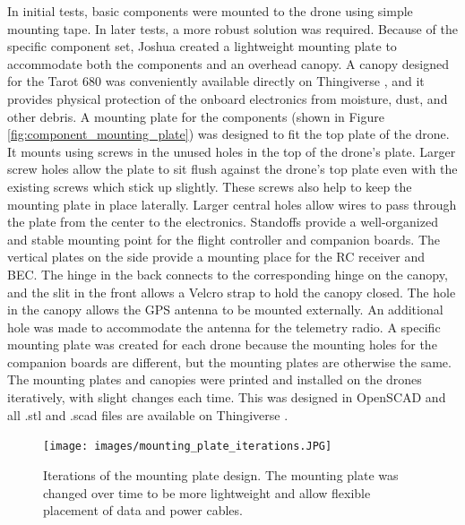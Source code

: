 In initial tests, basic components were mounted to the drone using simple mounting tape. In later tests, a more robust solution was required. Because of the specific component set, Joshua created a lightweight mounting plate to accommodate both the components and an overhead canopy. A canopy designed for the Tarot 680 was conveniently available directly on Thingiverse \cite{canopy_thingiverse}, and it provides physical protection of the onboard electronics from moisture, dust, and other debris. A mounting plate for the components (shown in Figure \ref{fig:component_mounting_plate}) was designed to fit the top plate of the drone. It mounts using screws in the unused holes in the top of the drone's plate. Larger screw holes allow the plate to sit flush against the drone's top plate even with the existing screws which stick up slightly. These screws also help to keep the mounting plate in place laterally. Larger central holes allow wires to pass through the plate from the center to the electronics. Standoffs provide a well-organized and stable mounting point for the flight controller and companion boards. The vertical plates on the side provide a mounting place for the RC receiver and BEC. The hinge in the back connects to the corresponding hinge on the canopy, and the slit in the front allows a Velcro strap to hold the canopy closed. The hole in the canopy allows the GPS antenna to be mounted externally. An additional hole was made to accommodate the antenna for the telemetry radio. A specific mounting plate was created for each drone because the mounting holes for the companion boards are different, but the mounting plates are otherwise the same. The mounting plates and canopies were printed and installed on the drones iteratively, with slight changes each time. This was designed in OpenSCAD and all .stl and .scad files are available on Thingiverse \cite{mounting_plate_thingiverse}.

\begin{figure}
    \centering
    \texttt{[image: images/mounting\_plate\_iterations.JPG]}
    \caption{Iterations of the mounting plate design. The mounting plate was changed over time to be more lightweight and allow flexible placement of data and power cables.}
    \label{fig:mounting_plate_iterations}
\end{figure}

